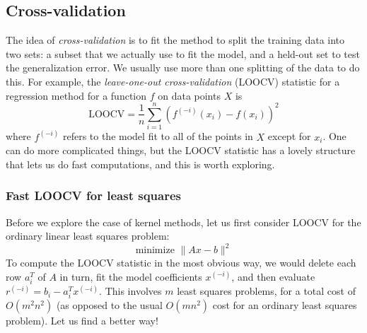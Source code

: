 \documentclass[12pt, leqno]{article} %
\begin{document}
\subsection{Cross-validation}

The idea of {\em cross-validation} is to fit the method to split the
training data into two sets: a subset that we actually use to fit the
model, and a held-out set to test the generalization error.  We
usually use more than one splitting of the data to do this.  For
example, the {\em leave-one-out cross-validation} (LOOCV) statistic
for a regression method for a function $f$ on data points $X$ is
\[
  \mbox{LOOCV} = \frac{1}{n} \sum_{i=1}^n (f^{(-i)}(x_i)-f(x_i))^2
\]
where $f^{(-i)}$ refers to the model fit to all of the points in $X$
except for $x_i$.  One can do more complicated things, but the LOOCV
statistic has a lovely structure that lets us do fast computations,
and this is worth exploring.

\subsubsection{Fast LOOCV for least squares}

Before we explore the case of kernel methods, let us first consider
LOOCV for the ordinary linear least squares problem:
\[
  \mbox{minimize } \|Ax-b\|^2
\]
To compute the LOOCV statistic in the most obvious way, we would
delete each row $a_i^T$ of $A$ in turn, fit the model coefficients
$x^{(-i)}$, and then evaluate $r^{(-i)} = b_i - a_i^T x^{(-i)}$.
This involves $m$
least squares problems, for a total cost of $O(m^2 n^2)$ (as opposed
to the usual $O(mn^2)$ cost for an ordinary least squares problem).
Let us find a better way!
\end{document}
